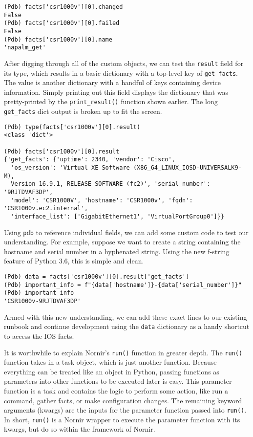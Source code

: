 \begin{verbatim}
(Pdb) facts['csr1000v'][0].changed
False
(Pdb) facts['csr1000v'][0].failed
False
(Pdb) facts['csr1000v'][0].name
'napalm_get'
\end{verbatim}

After digging through all of the custom objects, we can test the \verb|result|
field for its type, which results in a basic dictionary with a top-level key
of \verb|get_facts|. The value is another dictionary with a handful of keys
containing device information. Simply printing out this field displays the
dictionary that was pretty-printed by the \verb|print_result()| function shown earlier.
The long \verb|get_facts| dict output is broken up to fit the screen.

\begin{verbatim}
(Pdb) type(facts['csr1000v'][0].result)
<class 'dict'>

(Pdb) facts['csr1000v'][0].result
{'get_facts': {'uptime': 2340, 'vendor': 'Cisco',
  'os_version': 'Virtual XE Software (X86_64_LINUX_IOSD-UNIVERSALK9-M),
  Version 16.9.1, RELEASE SOFTWARE (fc2)', 'serial_number': '9RJTDVAF3DP',
  'model': 'CSR1000V', 'hostname': 'CSR1000v', 'fqdn': 'CSR1000v.ec2.internal',
  'interface_list': ['GigabitEthernet1', 'VirtualPortGroup0']}}
\end{verbatim}

Using \verb|pdb| to reference individual fields, we can add some custom code
to test our understanding. For example, suppose we want to create a string
containing the hostname and serial number in a hyphenated string. Using the
new f-string feature of Python 3.6, this is simple and clean.

\begin{verbatim}
(Pdb) data = facts['csr1000v'][0].result['get_facts']
(Pdb) important_info = f"{data['hostname']}-{data['serial_number']}"
(Pdb) important_info
'CSR1000v-9RJTDVAF3DP'
\end{verbatim}

Armed with this new understanding, we can add these exact lines to our
existing runbook and continue development using the \verb|data| dictionary as
a handy shortcut to access the IOS facts.

It is worthwhile to explain Nornir's \verb|run()| function in greater depth. The
\verb|run()| function takes in a task object, which is just another function. Because
everything can be treated like an object in Python, passing functions as
parameters into other functions to be executed later is easy. This parameter
function is a task and contains the logic to perform some action, like run a
command, gather facts, or make configuration changes. The remaining keyword
arguments (kwargs) are the inputs for the parameter function passed into
\verb|run()|. In short, \verb|run()| is a Nornir wrapper to execute the
parameter function with its kwargs, but do so within the framework of Nornir.

